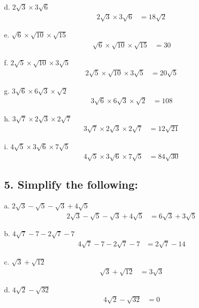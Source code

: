 \documentclass{article}
\begin{document}
d. $2 \sqrt{3} \times 3 \sqrt{6}$
\begin{align*}
    2 \sqrt{3} \times 3 \sqrt{6} &= 18\sqrt{2}
\end{align*}

e. $\sqrt{6} \times \sqrt{10} \times \sqrt{15}$
\begin{align*}
    \sqrt{6} \times \sqrt{10} \times \sqrt{15} &= 30
\end{align*}

f. $2 \sqrt{5} \times \sqrt{10} \times 3 \sqrt{5}$
\begin{align*}
    2 \sqrt{5} \times \sqrt{10} \times 3 \sqrt{5} &= 20\sqrt{5}
\end{align*}

g. $3 \sqrt{6} \times 6 \sqrt{3} \times \sqrt{2}$
\begin{align*}
    3 \sqrt{6} \times 6 \sqrt{3} \times \sqrt{2} &= 108
\end{align*}

h. $3 \sqrt{7} \times 2 \sqrt{3} \times 2 \sqrt{7}$
\begin{align*}
    3 \sqrt{7} \times 2 \sqrt{3} \times 2 \sqrt{7} &= 12\sqrt{21}
\end{align*}

i. $4 \sqrt{5} \times 3 \sqrt{6} \times 7 \sqrt{5}$
\begin{align*}
    4 \sqrt{5} \times 3 \sqrt{6} \times 7 \sqrt{5} &= 84\sqrt{30}
\end{align*}

\subsection*{5. Simplify the following:}

a. $2 \sqrt{3}-\sqrt{5}-\sqrt{3}+4 \sqrt{5}$
\begin{align*}
    2 \sqrt{3}-\sqrt{5}-\sqrt{3}+4 \sqrt{5} &= 6\sqrt{3}+3\sqrt{5}
\end{align*}

b. $4 \sqrt{7}-7-2 \sqrt{7}-7$
\begin{align*}
    4 \sqrt{7}-7-2 \sqrt{7}-7 &= 2\sqrt{7}-14
\end{align*}

c. $\sqrt{3}+\sqrt{12}$
\begin{align*}
    \sqrt{3}+\sqrt{12} &= 3\sqrt{3}
\end{align*}

d. $4 \sqrt{2}-\sqrt{32}$
\begin{align*}
    4 \sqrt{2}-\sqrt{32} &= 0
\end{align*}
\end{document}
